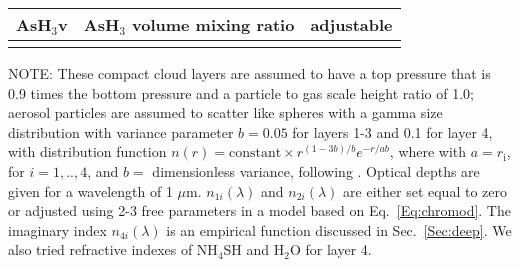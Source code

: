 \documentclass[article,11pt]{emulateapj}
\def\hto{H$_2$O }
\def\mumx{$\mu$m}
\def\hto{H$_2$O }
\def\nhfsh{NH$_4$SH }
\begin{document}
\begin{table*}[!htb]
\begin{tabular}{r l l }
AsH$_3$v & AsH$_3$ volume mixing ratio & adjustable\\
\hline\\%
\end{tabular}
\parbox{4.5in}{NOTE: These compact cloud layers are assumed to have a top pressure
  that is 0.9 times the bottom pressure and a particle to gas scale
  height ratio of 1.0; aerosol particles are assumed to scatter like
  spheres with a gamma size distribution with variance parameter
  $b=0.05$ for layers 1-3 and 0.1 for layer 4, with distribution
  function $n(r) = \mbox{constant}\times r^{(1-3b)/b} e^{-r/ab}$,
  where with $a = r_\mathrm{i}$, for $i=1,..,4$, and $b=$
  dimensionless variance, following \cite{Hansen1974}. Optical depths
  are given for a wavelength of 1 \mumx. $n_{1i}(\lambda)$ and
  $n_{2i}(\lambda)$ are either set equal to zero or adjusted using 2-3
  free parameters in a model based on Eq.\ \ref{Eq:chromod}. The
  imaginary index $n_{4i}(\lambda)$ is an empirical function discussed
  in Sec.\ \ref{Sec:deep}. We also tried refractive indexes of \nhfsh and \hto for layer 4.}
\label{Tbl:paramlist}
\end{table*}
\end{document}
